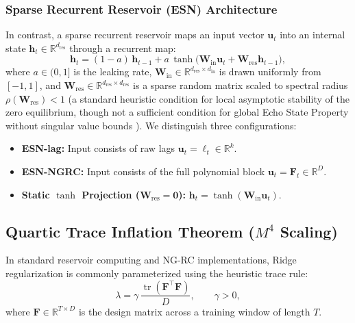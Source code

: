 \documentclass[aip,cha,reprint,amsmath,amssymb]{revtex4-2}
\begin{document}
\subsubsection{Sparse Recurrent Reservoir (ESN) Architecture}
In contrast, a sparse recurrent reservoir maps an input vector $\mathbf{u}_t$ into an internal state $\mathbf{h}_t \in \mathbb{R}^{d_{\text{res}}}$ through a recurrent map:
\begin{equation}
\mathbf{h}_t = (1 - a)\,\mathbf{h}_{t-1} + a\,\tanh\!\Big( \mathbf{W}_{\text{in}} \mathbf{u}_t + \mathbf{W}_{\text{res}} \mathbf{h}_{t-1} \Big),
\label{eq:esn_state}
\end{equation}
where $a \in (0, 1]$ is the leaking rate, $\mathbf{W}_{\text{in}} \in \mathbb{R}^{d_{\text{res}} \times d_{\text{in}}}$ is drawn uniformly from $[-1, 1]$, and $\mathbf{W}_{\text{res}} \in \mathbb{R}^{d_{\text{res}} \times d_{\text{res}}}$ is a sparse random matrix scaled to spectral radius $\rho(\mathbf{W}_{\text{res}}) < 1$ (a standard heuristic condition for local asymptotic stability of the zero equilibrium, though not a sufficient condition for global Echo State Property without singular value bounds \cite{manjunath2013theory}). We distinguish three configurations:
\begin{itemize}
    \item \textbf{ESN-lag:} Input consists of raw lags $\mathbf{u}_t = \bm{\ell}_t \in \mathbb{R}^k$.
    \item \textbf{ESN-NGRC:} Input consists of the full polynomial block $\mathbf{u}_t = \mathbf{F}_t \in \mathbb{R}^D$.
    \item \textbf{Static $\tanh$ Projection ($\mathbf{W}_{\text{res}} = \mathbf{0}$):} $\mathbf{h}_t = \tanh(\mathbf{W}_{\text{in}} \mathbf{u}_t)$.
\end{itemize}

\subsection{Quartic Trace Inflation Theorem ($M^4$ Scaling)}
\label{subsec:m4_theorem}

In standard reservoir computing and NG-RC implementations, Ridge regularization \cite{hoerl1970ridge} is commonly parameterized using the heuristic trace rule:
\begin{equation}
\lambda = \gamma\, \frac{\operatorname{tr}(\mathbf{F}^\top\mathbf{F})}{D}, \qquad \gamma > 0,
\label{eq:ridge_heuristic}
\end{equation}
where $\mathbf{F} \in \mathbb{R}^{T \times D}$ is the design matrix across a training window of length $T$.
\end{document}
